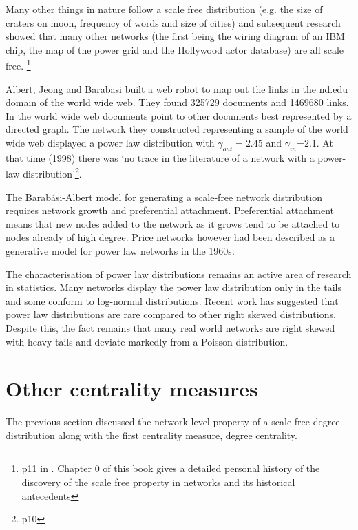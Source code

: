 Many other things in nature follow a scale free distribution (e.g. the size of craters on moon, frequency of words and size of cities) and subsequent research showed that many other networks (the first being the wiring diagram of an IBM chip, the map of the power grid and the Hollywood actor database) are all scale free\cite{barabasi2016network}. \footnote{ p11 in \cite{barabasi2016network}. Chapter 0 of this book gives a detailed personal history of the discovery of the scale free property in networks and its historical antecedents}

Albert, Jeong and Barabasi \cite{albert1999diameter} built a web robot to map out the links in the \url{nd.edu} domain of the world wide web. They found 325729 documents and 1469680 links. In  the world wide web documents point to other documents best represented by a directed graph. The network they constructed representing a sample of the world wide web displayed a power law distribution with $\gamma_{out}=2.45$ and $\gamma_{in}$=2.1. At that time (1998) there was `no trace in the literature of a network with a power-law distribution'\cite{barabasi2016network}\footnote{p10}.

The Barab\'asi-Albert model for generating a scale-free network distribution requires network growth and preferential attachment. Preferential attachment means that new nodes added to the network as it grows tend to be attached to nodes already of high degree\cite{barabasi1999emergence}. Price networks however had been described as a generative model for power law networks in the 1960s\cite{price1965networks}. 

The characterisation of power law distributions remains an active area of research in statistics. Many networks display the power law distribution only in the tails and some conform to log-normal distributions. Recent work has suggested that power law distributions are rare compared to other right skewed distributions\cite{broido2019scale}.  Despite this, the fact remains that many real world networks are right skewed with heavy tails and deviate markedly from a Poisson distribution. 





\section{ Other centrality measures}

The previous section discussed the network level property of a scale free degree distribution along with the first centrality measure, degree centrality. 
